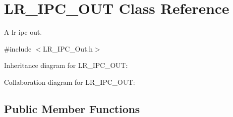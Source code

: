 \hypertarget{class_l_r___i_p_c___o_u_t}{}\section{L\+R\+\_\+\+I\+P\+C\+\_\+\+O\+UT Class Reference}
\label{class_l_r___i_p_c___o_u_t}


A lr ipc out.  




{\ttfamily \#include $<$L\+R\+\_\+\+I\+P\+C\+\_\+\+Out.\+h$>$}



Inheritance diagram for L\+R\+\_\+\+I\+P\+C\+\_\+\+O\+UT\+:


Collaboration diagram for L\+R\+\_\+\+I\+P\+C\+\_\+\+O\+UT\+:
\subsection*{Public Member Functions}
